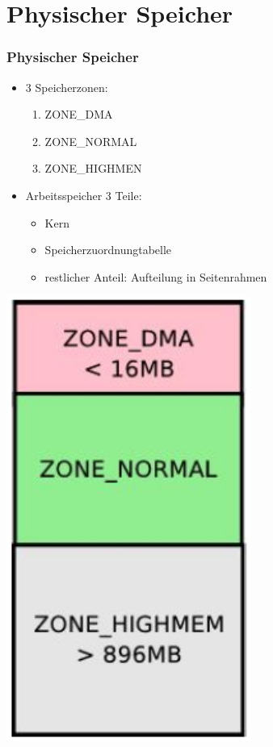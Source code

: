 \documentclass[ddcfooter,nosectionnum]{tudbeamer}
\begin{document}
\section{Physischer Speicher}
\begin{frame}
    \frametitle{Physischer Speicher}   
    
	\begin{minipage}[b]{0.7\textwidth} 
		 	\begin{itemize}
				\item 3 Speicherzonen: 
				\begin{enumerate}	 	
					\item ZONE\_DMA 
					\item ZONE\_NORMAL
					\item ZONE\_HIGHMEN
				\end{enumerate}
				\item Arbeitsspeicher 3 Teile: 
				\begin{itemize}
					\item Kern
					\item Speicherzuordnungtabelle
					\item restlicher Anteil: Aufteilung in Seitenrahmen
				\end{itemize}
			\end{itemize}
	\end{minipage}
	\begin{minipage}[t]{0.29\textwidth}
		\includegraphics[width=0.6\textwidth]{zonen.png}
	\end{minipage}
\end{frame}
\end{document}
